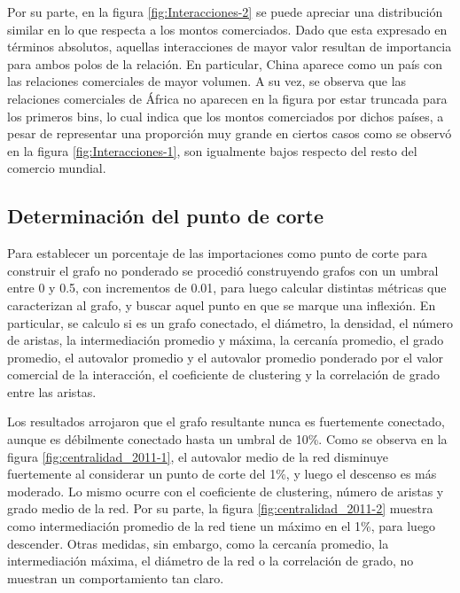 \documentclass[a4paper]{article}
\begin{document}
Por su parte, en la figura \ref{fig:Interacciones-2} se puede apreciar una distribución similar en lo que respecta a los montos comerciados. Dado que esta expresado en términos absolutos, aquellas interacciones de mayor valor resultan de importancia para ambos polos de la relación. En particular, China aparece como un país con las relaciones comerciales de mayor volumen. A su vez, se observa que las relaciones comerciales de África no aparecen en la figura por estar truncada para los primeros bins, lo cual indica que los montos comerciados por dichos países, a pesar de representar una proporción muy grande en ciertos casos como se observó en la figura \ref{fig:Interacciones-1}, son igualmente bajos respecto del resto del comercio mundial.


\subsection{Determinación del punto de corte}


Para establecer un porcentaje de las importaciones como punto de corte para construir el grafo no ponderado se procedió construyendo grafos con un umbral entre 0 y 0.5, con incrementos de 0.01, para luego calcular distintas métricas que caracterizan al grafo, y buscar aquel punto en que se marque una inflexión. En particular, se calculo si es un grafo conectado, el diámetro, la densidad, el número de aristas, la intermediación promedio y máxima, la cercanía promedio, el grado promedio, el autovalor promedio y el autovalor promedio ponderado por el valor comercial de la interacción, el coeficiente de clustering y la correlación de grado entre las aristas.

Los resultados arrojaron que el grafo resultante nunca es fuertemente conectado, aunque es débilmente conectado hasta un umbral de 10\%. 
Como se observa en la figura \ref{fig:centralidad_2011-1}, el autovalor medio de la red disminuye fuertemente al considerar un punto de corte del 1\%, y luego el descenso es más moderado. Lo mismo ocurre con el coeficiente de clustering, número de aristas y grado medio de la red. Por su parte, la figura \ref{fig:centralidad_2011-2} muestra como intermediación promedio de la red tiene un máximo en el 1\%, para luego descender. Otras medidas, sin embargo, como la cercanía promedio, la intermediación máxima, el diámetro de la red o la correlación de grado, no muestran un comportamiento tan claro.
\end{document}
